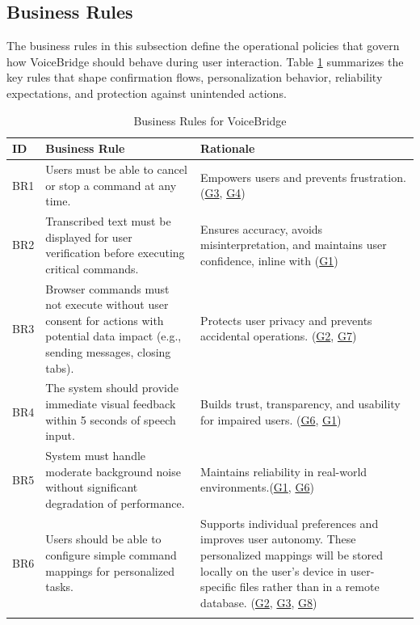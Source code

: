 \documentclass[11pt]{article}
\begin{document}
\subsection{Business Rules}
The business rules in this subsection define the operational policies that govern how VoiceBridge should behave during user interaction. Table \ref{tab:business-rules} summarizes the key rules that shape confirmation flows, personalization behavior, reliability expectations, and protection against unintended actions.

\begin{table}[H]
\centering
\begin{tabularx}{\textwidth}{p{1cm} X X}
\toprule
\textbf{ID} & \textbf{Business Rule} & \textbf{Rationale} \\
\midrule
BR1 & Users must be able to cancel or stop a command at any time. & Empowers users and prevents frustration. (\hyperref[tab:project-goals]{G3}, \hyperref[tab:project-goals]{G4}) \\
BR2 & Transcribed text must be displayed for user verification before executing critical commands. & Ensures accuracy, avoids misinterpretation, and maintains user confidence, inline with (\hyperref[tab:project-goals]{G1}) \\
BR3 & Browser commands must not execute without user consent for actions with potential data impact (e.g., sending messages, closing tabs). & Protects user privacy and prevents accidental operations. (\hyperref[tab:project-goals]{G2}, \hyperref[tab:project-goals]{G7}) \\
BR4 & The system should provide immediate visual feedback within 5 seconds of speech input. & Builds trust, transparency, and usability for impaired users. (\hyperref[tab:project-goals]{G6}, \hyperref[tab:project-goals]{G1}) \\
BR5 & System must handle moderate background noise without significant degradation of performance. & Maintains reliability in real-world environments.(\hyperref[tab:project-goals]{G1}, \hyperref[tab:project-goals]{G6}) \\
BR6 & Users should be able to configure simple command mappings for personalized tasks. & Supports individual preferences and improves user autonomy. These personalized mappings will be stored locally on the user's device in user-specific files rather than in a remote database. (\hyperref[tab:project-goals]{G2}, \hyperref[tab:project-goals]{G3}, \hyperref[tab:project-goals]{G8}) \\
\bottomrule
\caption{Business Rules for VoiceBridge}
\end{tabularx}
\label{tab:business-rules}
\end{table}
\end{document}
